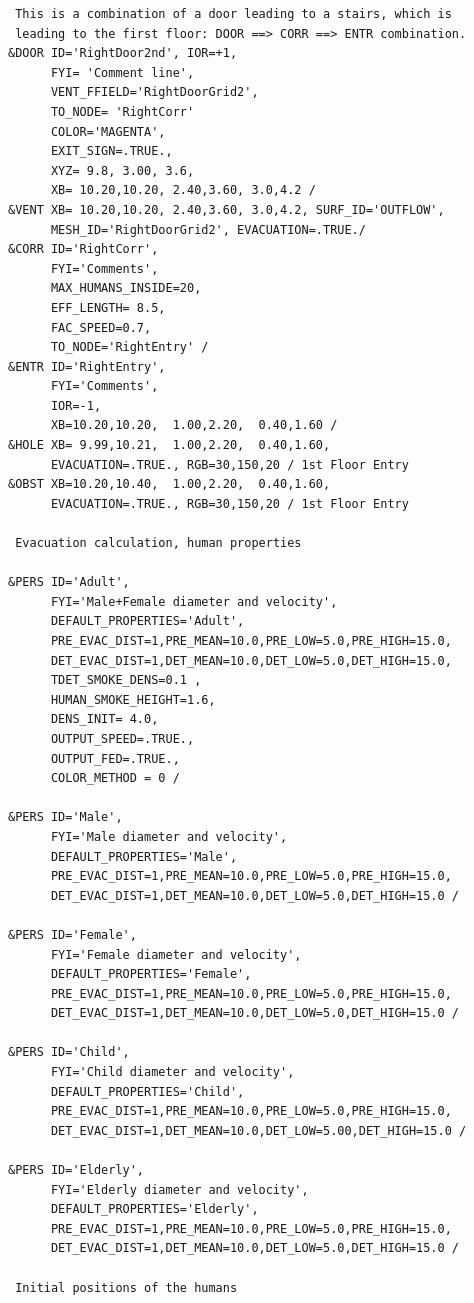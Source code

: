 \documentclass[12pt,a4paper,final,twoside]{stylevk}
\begin{document}
{\begin{verbatim}
 This is a combination of a door leading to a stairs, which is
 leading to the first floor: DOOR ==> CORR ==> ENTR combination.
&DOOR ID='RightDoor2nd', IOR=+1,
      FYI= 'Comment line',
      VENT_FFIELD='RightDoorGrid2',
      TO_NODE= 'RightCorr'
      COLOR='MAGENTA',
      EXIT_SIGN=.TRUE.,
      XYZ= 9.8, 3.00, 3.6,
      XB= 10.20,10.20, 2.40,3.60, 3.0,4.2 /
&VENT XB= 10.20,10.20, 2.40,3.60, 3.0,4.2, SURF_ID='OUTFLOW', 
      MESH_ID='RightDoorGrid2', EVACUATION=.TRUE./ 
&CORR ID='RightCorr',
      FYI='Comments',
      MAX_HUMANS_INSIDE=20,
      EFF_LENGTH= 8.5,
      FAC_SPEED=0.7,
      TO_NODE='RightEntry' /
&ENTR ID='RightEntry',
      FYI='Comments',
      IOR=-1,
      XB=10.20,10.20,  1.00,2.20,  0.40,1.60 /
&HOLE XB= 9.99,10.21,  1.00,2.20,  0.40,1.60, 
      EVACUATION=.TRUE., RGB=30,150,20 / 1st Floor Entry
&OBST XB=10.20,10.40,  1.00,2.20,  0.40,1.60, 
      EVACUATION=.TRUE., RGB=30,150,20 / 1st Floor Entry

 Evacuation calculation, human properties

&PERS ID='Adult',
      FYI='Male+Female diameter and velocity',
      DEFAULT_PROPERTIES='Adult',
      PRE_EVAC_DIST=1,PRE_MEAN=10.0,PRE_LOW=5.0,PRE_HIGH=15.0,
      DET_EVAC_DIST=1,DET_MEAN=10.0,DET_LOW=5.0,DET_HIGH=15.0,
      TDET_SMOKE_DENS=0.1 ,
      HUMAN_SMOKE_HEIGHT=1.6,
      DENS_INIT= 4.0,
      OUTPUT_SPEED=.TRUE.,
      OUTPUT_FED=.TRUE.,
      COLOR_METHOD = 0 /

&PERS ID='Male',
      FYI='Male diameter and velocity',
      DEFAULT_PROPERTIES='Male',
      PRE_EVAC_DIST=1,PRE_MEAN=10.0,PRE_LOW=5.0,PRE_HIGH=15.0,
      DET_EVAC_DIST=1,DET_MEAN=10.0,DET_LOW=5.0,DET_HIGH=15.0 /

&PERS ID='Female',
      FYI='Female diameter and velocity',
      DEFAULT_PROPERTIES='Female',
      PRE_EVAC_DIST=1,PRE_MEAN=10.0,PRE_LOW=5.0,PRE_HIGH=15.0,
      DET_EVAC_DIST=1,DET_MEAN=10.0,DET_LOW=5.0,DET_HIGH=15.0 /

&PERS ID='Child',
      FYI='Child diameter and velocity',
      DEFAULT_PROPERTIES='Child',
      PRE_EVAC_DIST=1,PRE_MEAN=10.0,PRE_LOW=5.0,PRE_HIGH=15.0,
      DET_EVAC_DIST=1,DET_MEAN=10.0,DET_LOW=5.00,DET_HIGH=15.0 /

&PERS ID='Elderly',
      FYI='Elderly diameter and velocity',
      DEFAULT_PROPERTIES='Elderly',
      PRE_EVAC_DIST=1,PRE_MEAN=10.0,PRE_LOW=5.0,PRE_HIGH=15.0,
      DET_EVAC_DIST=1,DET_MEAN=10.0,DET_LOW=5.0,DET_HIGH=15.0 /

 Initial positions of the humans


\end{verbatim}}
\end{document}
